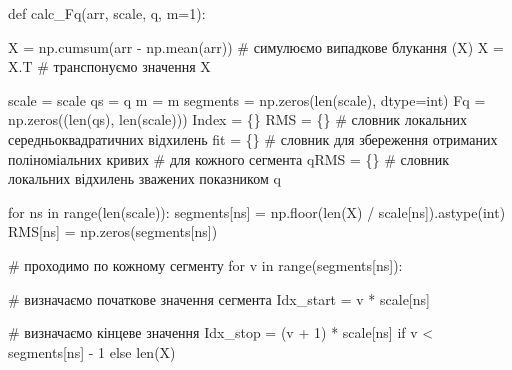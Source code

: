 \documentclass[
  letterpaper,
]{report}
\newenvironment{Shaded}{\begin{snugshade}}{\end{snugshade}}
\newcommand{\BuiltInTok}[1]{\textcolor[rgb]{0.00,0.23,0.31}{#1}}
\newcommand{\CommentTok}[1]{\textcolor[rgb]{0.37,0.37,0.37}{#1}}
\newcommand{\ControlFlowTok}[1]{\textcolor[rgb]{0.00,0.23,0.31}{#1}}
\newcommand{\DecValTok}[1]{\textcolor[rgb]{0.68,0.00,0.00}{#1}}
\newcommand{\KeywordTok}[1]{\textcolor[rgb]{0.00,0.23,0.31}{#1}}
\newcommand{\NormalTok}[1]{\textcolor[rgb]{0.00,0.23,0.31}{#1}}
\newcommand{\OperatorTok}[1]{\textcolor[rgb]{0.37,0.37,0.37}{#1}}
\begin{document}
\begin{Shaded}
\begin{Highlighting}[]
\KeywordTok{def}\NormalTok{ calc\_Fq(arr, scale, q, m}\OperatorTok{=}\DecValTok{1}\NormalTok{):}
    
\NormalTok{    X }\OperatorTok{=}\NormalTok{ np.cumsum(arr }\OperatorTok{{-}}\NormalTok{ np.mean(arr)) }\CommentTok{\# симулюємо випадкове блукання (X)}
\NormalTok{    X }\OperatorTok{=}\NormalTok{ X.T                           }\CommentTok{\# транспонуємо значення X}

\NormalTok{    scale }\OperatorTok{=}\NormalTok{ scale }
\NormalTok{    qs }\OperatorTok{=}\NormalTok{ q}
\NormalTok{    m }\OperatorTok{=}\NormalTok{ m}
\NormalTok{    segments }\OperatorTok{=}\NormalTok{ np.zeros(}\BuiltInTok{len}\NormalTok{(scale), dtype}\OperatorTok{=}\BuiltInTok{int}\NormalTok{)}
\NormalTok{    Fq }\OperatorTok{=}\NormalTok{ np.zeros((}\BuiltInTok{len}\NormalTok{(qs), }\BuiltInTok{len}\NormalTok{(scale)))}
\NormalTok{    Index }\OperatorTok{=}\NormalTok{ \{\}}
\NormalTok{    RMS }\OperatorTok{=}\NormalTok{ \{\}    }\CommentTok{\# словник локальних середньоквадратичних відхилень}
\NormalTok{    fit }\OperatorTok{=}\NormalTok{ \{\}    }\CommentTok{\# словник для збереження отриманих поліноміальних кривих}
                \CommentTok{\# для кожного сегмента}
\NormalTok{    qRMS }\OperatorTok{=}\NormalTok{ \{\}   }\CommentTok{\# словник локальних відхилень зважених показником q}

    \ControlFlowTok{for}\NormalTok{ ns }\KeywordTok{in} \BuiltInTok{range}\NormalTok{(}\BuiltInTok{len}\NormalTok{(scale)):}
\NormalTok{        segments[ns] }\OperatorTok{=}\NormalTok{ np.floor(}\BuiltInTok{len}\NormalTok{(X) }\OperatorTok{/}\NormalTok{ scale[ns]).astype(}\BuiltInTok{int}\NormalTok{)}
\NormalTok{        RMS[ns] }\OperatorTok{=}\NormalTok{ np.zeros(segments[ns])}

        \CommentTok{\# проходимо по кожному сегменту}
        \ControlFlowTok{for}\NormalTok{ v }\KeywordTok{in} \BuiltInTok{range}\NormalTok{(segments[ns]): }

            \CommentTok{\# визначаємо початкове значення сегмента}
\NormalTok{            Idx\_start }\OperatorTok{=}\NormalTok{ v }\OperatorTok{*}\NormalTok{ scale[ns]  }
                       
            \CommentTok{\# визначаємо кінцеве значення}
\NormalTok{            Idx\_stop }\OperatorTok{=}\NormalTok{ (v }\OperatorTok{+} \DecValTok{1}\NormalTok{) }\OperatorTok{*}\NormalTok{ scale[ns] }\ControlFlowTok{if}\NormalTok{ v }\OperatorTok{\textless{}}\NormalTok{ segments[ns] }\OperatorTok{{-}} \DecValTok{1} \ControlFlowTok{else} \BuiltInTok{len}\NormalTok{(X)    }
            

\end{Highlighting}
\end{Shaded}
\end{document}
